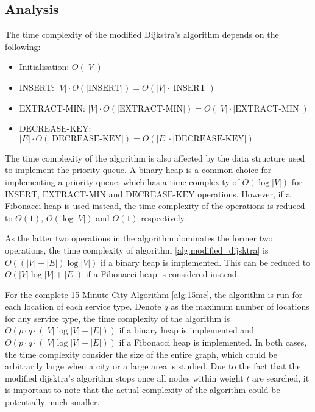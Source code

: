 \subsection{Analysis}

The time complexity of the modified Dijkstra's algorithm depends on the following:

\begin{itemize}
    \item Initialisation: $O(|V|)$
    \item $\text{INSERT}$: $|V|\cdot O(|\text{INSERT}|)=O(|V|\cdot|\text{INSERT}|)$
    \item $\text{EXTRACT-MIN}$: $|V|\cdot O(|\text{EXTRACT-MIN}|)=O(|V|\cdot|\text{EXTRACT-MIN}|)$
    \item $\text{DECREASE-KEY}$: $|E|\cdot O(|\text{DECREASE-KEY}|)=O(|E|\cdot|\text{DECREASE-KEY}|)$
\end{itemize}

The time complexity of the algorithm is also affected by the data structure used to implement the priority queue. A binary heap is a common choice for implementing a priority queue, which has a time complexity of $O(\log |V|)$ for $\text{INSERT}$, $\text{EXTRACT-MIN}$ and $\text{DECREASE-KEY}$ operations. However, if a Fibonacci heap is used instead, the time complexity of the operations is reduced to $\Theta(1)$, $O(\log |V|)$ and $\Theta(1)$ respectively.

As the latter two operations in the algorithm dominates the former two operations, the time complexity of algorithm \ref{alg:modified_dijsktra} is $O((|V|+|E|)\log |V|)$ if a binary heap is implemented. This can be reduced to $O(|V|\log |V|+|E|)$ if a Fibonacci heap is considered instead.

For the complete 15-Minute City Algorithm \ref{alg:15mc}, the algorithm is run for each location of each service type. Denote $q$ as the maximum number of locations for any service type, the time complexity of the algorithm is $O(p\cdot q\cdot(|V|\log |V|+|E|))$ if a binary heap is implemented and $O(p\cdot q\cdot(|V|\log |V|+|E|))$ if a Fibonacci heap is implemented. In both cases, the time complexity consider the size of the entire graph, which could be arbitrarily large when a city or a large area is studied. Due to the fact that the modified dijsktra's algorithm stops once all nodes within weight $t$ are searched, it is important to note that the actual complexity of the algorithm could be potentially much smaller.

